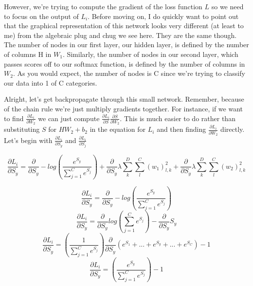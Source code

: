 \documentclass[12pt]{article}
\begin{document}
However, we're trying to compute the gradient of the loss function $L$ so we need 
to focus on the output of $L_i$. Before moving on, I do quickly want to point out that the graphical 
representation of this network looks very different (at least to me) from the algebraic plug 
and chug we see here. They are the same though. The number of nodes in our first layer, our hidden 
layer, is defined by the number of columns H in $W_1$. Similarly, the number of nodes in our second
layer, which passes scores off to our softmax function, is defined by the number of columns in $W_2$. 
As you would expect, the number of nodes is C since we're trying to classify our data into 1 of 
C categories. 

Alright, let's get backpropagate through this small network. Remember, because of the chain 
rule we're just multiply gradients together. For instance, if we want to find $\frac{\partial L_i}
{\partial W_2}$ we can just compute $\frac{\partial L_i}{\partial S} \frac{\partial S}{\partial W_2}$. 
This is much easier to do rather than substituting $S$ for $HW_2 + b_2$ in the equation for $L_i$ 
and then finding $\frac{\partial L_i}{\partial W_2}$ directly. Let's begin with $\frac{\partial L_i}{\partial S_y}$
and $\frac{\partial L_i}{\partial S_j}$

\begin{equation}
    \frac{\partial L_i}{\partial S_y} =  \frac{\partial}{\partial S_y}
    - log(\frac{e^{S_y}}{{\sum_{j=1}^C} e^{S_j}}) + \frac{\partial}{\partial S_y}
    \lambda \sum_{k}^D \sum_{l}^C (w_1)_{l, k}^2 + \frac{\partial}{\partial S_y}
    \lambda \sum_{k}^D \sum_{l}^C (w_2)_{l, k}^2
\end{equation}

\begin{equation}
    \frac{\partial L_i}{\partial S_y} =  \frac{\partial}{\partial S_y}
    - log(\frac{e^{S_y}}{{\sum_{j=1}^C} e^{S_j}})
\end{equation}
\begin{equation}
    \frac{\partial L_i}{\partial S_y} =  \frac{\partial}{\partial S_y}
    log({\sum_{j=1}^C} e^{S_j}) - \frac{\partial}{\partial S_y} S_y
\end{equation}
\begin{equation}
    \frac{\partial L_i}{\partial S_y} =  (\frac{1}{\sum_{j=1}^C e^{S_j}})
    \frac{\partial}{\partial S_y} (e^{S_1} + ... + e^{S_y} + ... + e^{S_C}) - 1
\end{equation}
\begin{equation}
    \frac{\partial L_i}{\partial S_y} =  (\frac{e^{S_y}}{\sum_{j=1}^C e^{S_j}})- 1
\end{equation}
\end{document}

